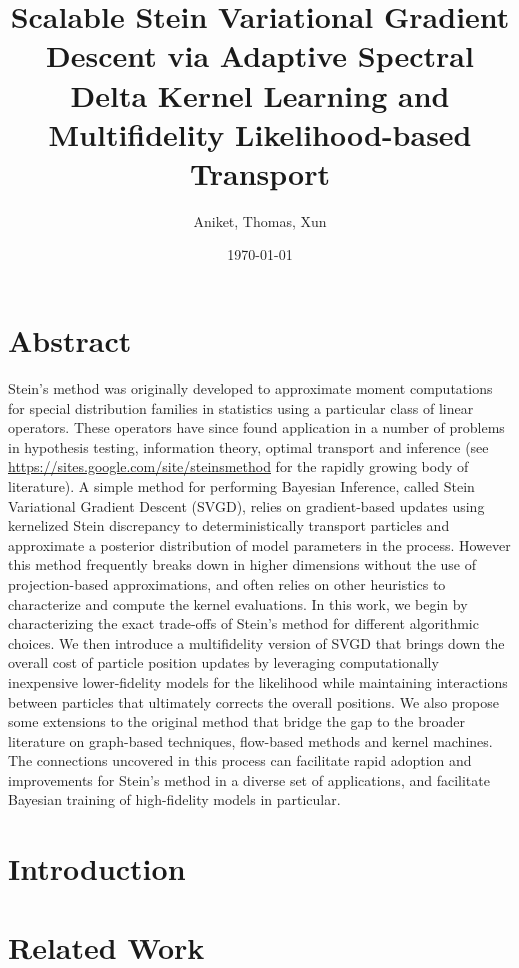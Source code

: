 \documentclass[12pt]{article}
\title{Scalable Stein Variational Gradient Descent via Adaptive Spectral Delta Kernel Learning and Multifidelity Likelihood-based Transport}
\author{Aniket, Thomas, Xun}
\date{\today}
\renewcommand{\[}{\left[}
\renewcommand{\]}{\right]}
\renewcommand{\(}{\left(}
\renewcommand{\)}{\right)}
\begin{document}
\maketitle
\section*{Abstract}
Stein's method was originally developed to approximate moment computations for special distribution families in statistics using a particular class of linear operators.
These operators have since found application in a number of problems in hypothesis testing, information theory, optimal transport and inference (see \url{https://sites.google.com/site/steinsmethod} for the rapidly growing body of literature). 
A simple method for performing Bayesian Inference, called Stein Variational Gradient Descent (SVGD), relies on gradient-based updates using kernelized Stein discrepancy to deterministically transport particles and approximate a posterior distribution of model parameters in the process. 
However this method frequently breaks down in higher dimensions without the use of projection-based approximations, and often relies on other heuristics to characterize and compute the kernel evaluations.
In this work, we begin by characterizing the exact trade-offs of Stein's method for different algorithmic choices. 
We then introduce a multifidelity version of SVGD that brings down the overall cost of particle position updates by leveraging computationally inexpensive lower-fidelity models for the likelihood while maintaining interactions between particles that ultimately corrects the overall positions.
We also propose some extensions to the original method that bridge the gap to the broader literature on graph-based techniques, flow-based methods and kernel machines. 
The connections uncovered in this process can facilitate rapid adoption and improvements for Stein's method in a diverse set of applications, and facilitate Bayesian training of high-fidelity models in particular.



\section{Introduction}



\section{Related Work}
\end{document}
